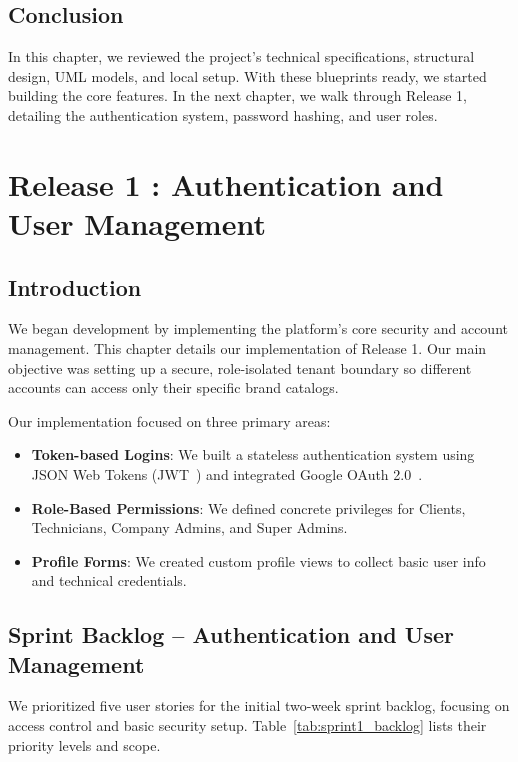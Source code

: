 \documentclass[12pt,a4paper]{report}
\begin{document}
\section{Conclusion}

In this chapter, we reviewed the project's technical specifications, structural design, UML models, and local setup. With these blueprints ready, we started building the core features. In the next chapter, we walk through Release 1, detailing the authentication system, password hashing, and user roles.

\chapter{Release 1 : Authentication and User Management}

\section{Introduction}

We began development by implementing the platform's core security and account management. This chapter details our implementation of Release 1. Our main objective was setting up a secure, role-isolated tenant boundary so different accounts can access only their specific brand catalogs.

Our implementation focused on three primary areas:
\begin{itemize}
    \item \textbf{Token-based Logins}: We built a stateless authentication system using JSON Web Tokens (JWT~\cite{jwt}) and integrated Google OAuth 2.0~\cite{oauth2}.
    \item \textbf{Role-Based Permissions}: We defined concrete privileges for Clients, Technicians, Company Admins, and Super Admins.
    \item \textbf{Profile Forms}: We created custom profile views to collect basic user info and technical credentials.
\end{itemize}

\section{Sprint Backlog -- Authentication and User Management}

We prioritized five user stories for the initial two-week sprint backlog, focusing on access control and basic security setup. Table~\ref{tab:sprint1_backlog} lists their priority levels and scope.
\end{document}
